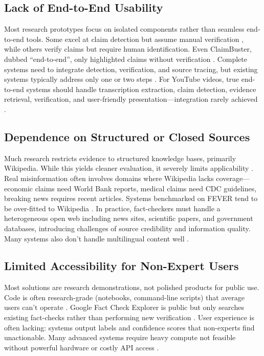 \documentclass[12pt,a4paper]{article}
\begin{document}
\subsection{Lack of End-to-End Usability}

Most research prototypes focus on isolated components rather than seamless end-to-end tools. Some excel at claim detection but assume manual verification \citep{hassan2021claimbuster}, while others verify claims but require human identification. Even ClaimBuster, dubbed ``end-to-end'', only highlighted claims without verification \citep{hassan2021claimbuster}. Complete systems need to integrate detection, verification, and source tracing, but existing systems typically address only one or two steps \citep{lin2025factaudit}. For YouTube videos, true end-to-end systems should handle transcription extraction, claim detection, evidence retrieval, verification, and user-friendly presentation—integration rarely achieved \citep{lin2025factaudit}.

\subsection{Dependence on Structured or Closed Sources}

Much research restricts evidence to structured knowledge bases, primarily Wikipedia. While this yields cleaner evaluation, it severely limits applicability \citep{aly2021feverous}. Real misinformation often involves domains where Wikipedia lacks coverage—economic claims need World Bank reports, medical claims need CDC guidelines, breaking news requires recent articles. Systems benchmarked on FEVER tend to be over-fitted to Wikipedia \citep{thorne2018fever}. In practice, fact-checkers must handle a heterogeneous open web including news sites, scientific papers, and government databases, introducing challenges of source credibility and information quality. Many systems also don't handle multilingual content well \citep{aly2021feverous}.

\subsection{Limited Accessibility for Non-Expert Users}

Most solutions are research demonstrations, not polished products for public use. Code is often research-grade (notebooks, command-line scripts) that average users can't operate \citep{lin2025factaudit}. Google Fact Check Explorer is public but only searches existing fact-checks rather than performing new verification \citep{google2024factcheck}. User experience is often lacking: systems output labels and confidence scores that non-experts find unactionable. Many advanced systems require heavy compute not feasible without powerful hardware or costly API access \citep{lin2025factaudit}.
\end{document}
